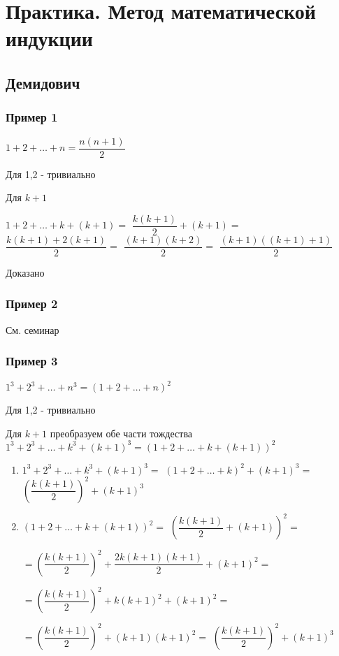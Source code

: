 \section{Практика. Метод математической индукции}

\subsection{Демидович}

\subsubsection{Пример 1}

$ 1 + 2 + \ldots + n = \dfrac{n(n+1)}{2} $

Для 1,2 - тривиально

Для $ k+1 $

$ 1 + 2 + \ldots + k + (k+1) = $
$ \dfrac{k(k+1)}{2} + (k+1) =  $
$ \dfrac{k(k+1) + 2(k+1)}{2} = $
$\dfrac{(k+1)(k+2)}{2} =$
$\dfrac{(k+1)((k+1) + 1)}{2}$

Доказано

\subsubsection{Пример 2}

См. семинар

\subsubsection{Пример 3}

$ 1^{3} + 2^{3} + \ldots + n^{3} = (1 + 2 + \ldots + n)^{2} $

Для 1,2 - тривиально

Для $ k+1 $ преобразуем обе части тождества
$ 1^{3} + 2^{3} + \ldots + k^{3} + (k+1)^{3} = (1 + 2 + \ldots + k + (k+1))^{2} $

\begin{enumerate}

\item 
$ 1^{3} + 2^{3} + \ldots + k^{3} + (k+1)^{3} =$
$ (1 + 2 + \ldots + k)^{2} + (k+1)^{3} = $
$ \left( \dfrac{k(k+1)}{2} \right)^{2} + (k+1)^{3}  $

\item 
$ (1 + 2 + \ldots + k + (k+1))^{2} = $
$   \left( \dfrac{k(k+1)}{2} + (k+1) \right)^{2} = $

$ = \left( \dfrac{k(k+1)}{2} \right)^{2} + \dfrac{2k(k+1)(k+1)}{2} + (k+1)^{2} = $

$  = \left( \dfrac{k(k+1)}{2} \right)^{2} + k(k+1)^{2} + (k+1)^{2} =  $

$  = \left( \dfrac{k(k+1)}{2} \right)^{2} + (k+1)(k+1)^{2} =  $
$  \left( \dfrac{k(k+1)}{2} \right)^{2} + (k+1)^{3} $
\end{enumerate}


